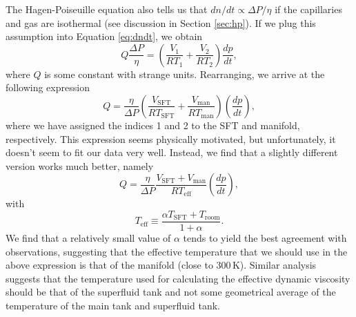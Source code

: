 \documentclass[
12pt, %
letterpaper, %
oneside, %
headinclude, footinclude, %
BCOR5mm, %
]{scrartcl}
\newcommand{\mrm}[1]{\mathrm{#1}}
\begin{document}
The Hagen-Poiseuille equation also tells us that $dn/dt \propto \Delta P /\eta$ if the capillaries and gas are isothermal (see discussion in Section \ref{sec:hp}). If we plug this assumption into Equation \ref{eq:dndt}, we obtain
\begin{equation}
Q \frac{\Delta P}{\eta} = \left(\frac{V_1}{RT_1} + \frac{V_2}{RT_2} \right) \frac{dp}{dt},
\end{equation}
where $Q$ is some constant with strange units. Rearranging, we arrive at the following expression
\begin{equation}
Q = \frac{\eta }{\Delta P} \left( \frac{V_\mrm{SFT}}{RT_\mrm{SFT}}+\frac{V_\mrm{man}}{RT_\mrm{man}} \right) \left( \frac{d p}{d t} \right),
\end{equation}
where we have assigned the indices 1 and 2 to the SFT and manifold, respectively. This expression seems physically motivated, but unfortunately, it doesn't seem to fit our data very well. Instead, we find that a slightly different version works much better, namely
\begin{equation}
Q = \frac{\eta }{\Delta P}\frac{V_\mrm{SFT}+V_\mrm{man}}{RT_\mrm{eff}} \left( \frac{d p}{d t} \right),
\label{eq:q}
\end{equation}
with 
\begin{equation}
T_\mrm{eff} \equiv \frac{\alpha T_\mrm{SFT}+T_\mrm{room}}{1+\alpha}.
\end{equation}
We find that a relatively small value of $\alpha$ tends to yield the best agreement with observations, suggesting that the effective temperature that we should use in the above expression is that of the manifold (close to 300\,K). Similar analysis suggests that the temperature used for calculating the effective dynamic viscosity should be that of the superfluid tank and not some geometrical average of the temperature of the main tank and superfluid tank.

\end{document}

